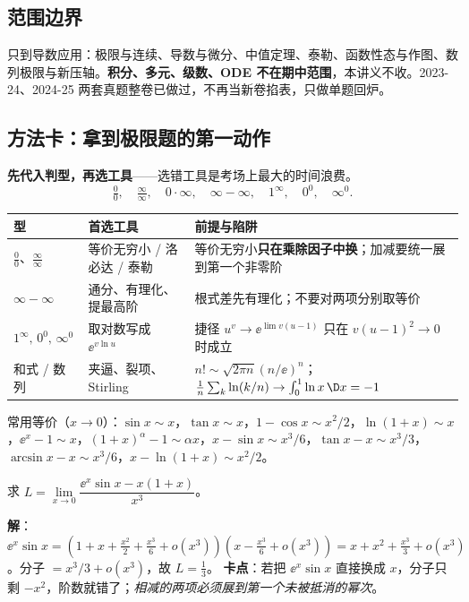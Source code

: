 \subsection*{范围边界}
只到导数应用：极限与连续、导数与微分、中值定理、泰勒、函数性态与作图、数列极限与新压轴。\textbf{积分、多元、级数、ODE 不在期中范围}，本讲义不收。2023-24、2024-25 两套真题整卷已做过，不再当新卷掐表，只做单题回炉。

\newpage
\tableofcontents
\newpage

\subsection{方法卡：拿到极限题的第一动作}

\textbf{先代入判型，再选工具}——选错工具是考场上最大的时间浪费。
\[
\tfrac00,\quad\tfrac{\infty}{\infty},\quad 0\cdot\infty,\quad\infty-\infty,\quad 1^\infty,\quad 0^0,\quad \infty^0 .
\]

\begin{center}
\begin{tabular}{@{}p{3.1cm}p{5.1cm}p{7.0cm}@{}}
\toprule
\textbf{型} & \textbf{首选工具} & \textbf{前提与陷阱} \\
\midrule
$\tfrac00$、$\tfrac{\infty}{\infty}$ & 等价无穷小 / 洛必达 / 泰勒 & 等价无穷小\textbf{只在乘除因子中换}；加减要统一展到第一个非零阶 \\
$\infty-\infty$ & 通分、有理化、提最高阶 & 根式差先有理化；不要对两项分别取等价 \\
$1^\infty,\,0^0,\,\infty^0$ & 取对数写成 $\ee^{v\ln u}$ & 捷径 $u^v\to\ee^{\lim v(u-1)}$ 只在 $v(u-1)^2\to0$ 时成立 \\
和式 / 数列 & 夹逼、裂项、Stirling & $n!\sim\sqrt{2\pi n}(n/\ee)^n$；$\frac1n\sum_k\ln(k/n)\to\int_0^1\ln x\,\D x=-1$ \\
\bottomrule
\end{tabular}
\end{center}

常用等价（$x\to0$）：$\sin x\sim x$，$\tan x\sim x$，$1-\cos x\sim x^2/2$，$\ln(1+x)\sim x$，$\ee^x-1\sim x$，$(1+x)^\alpha-1\sim\alpha x$，$x-\sin x\sim x^3/6$，$\tan x-x\sim x^3/3$，$\arcsin x-x\sim x^3/6$，$x-\ln(1+x)\sim x^2/2$。

\begin{keypoint}
求 $L=\lim\limits_{x\to0}\dfrac{\ee^{x}\sin x-x(1+x)}{x^{3}}$。

\noindent\textbf{解}：$\ee^x\sin x=(1+x+\frac{x^2}{2}+\frac{x^3}{6}+o(x^3))(x-\frac{x^3}{6}+o(x^3))
=x+x^{2}+\frac{x^{3}}{3}+o(x^{3})$。分子 $=x^{3}/3+o(x^{3})$，故 $L=\boxed{\tfrac13}$。
\textbf{卡点}：若把 $\ee^x\sin x$ 直接换成 $x$，分子只剩 $-x^2$，阶数就错了；\emph{相减的两项必须展到第一个未被抵消的幂次}。
\end{keypoint}

